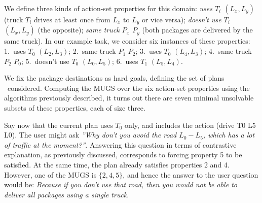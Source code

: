 We define three kinds of action-set properties for this domain:
\emph{uses $T_i$ $(L_x,L_y)$} (truck $T_i$ drives at least once from
$L_x$ to $L_y$ or vice versa); \emph{doesn't use $T_i$ $(L_x,L_y)$}
(the opposite); \emph{same truck $P_x$ $P_y$} (both packages are
delivered by the same truck). In our example task, we consider six
instances of these properties: 1.\ uses $T_0$ $(L_2,L_3)$; 2.\ same
truck $P_1$ $P_2$; 3.\ uses $T_0$ $(L_4,L_3)$; 4.\ same truck $P_2$
$P_0$; 5.\ doesn't use $T_0$ $(L_0,L_5)$; 6.\ uses $T_1$ $(L_5,L_4)$.

We fix the package destinations as hard goals, defining the set of
plans \plans\ considered. Computing the MUGS over the six action-set
properties using the algorithms previously described, it turns out
there are seven minimal unsolvable subsets of these properties, each
of size three.

Say now that the current plan uses $T_0$ only, and includes the action
(drive T0 L5 L0). The user might ask \emph{''Why don't you avoid the
  road $L_0-L_5$, which has a lot of traffic at the
  moment?''}. Answering this question in terms of contrastive
explanation, as previously discussed, corresponds to forcing property
5 to be satisfied. At the same time, the plan already satisfies
properties 2 and 4. However, one of the MUGS is $\{2,4,5\}$, and hence
the answer to the user question would be: \textit{Because if you don't
  use that road, then you would not be able to deliver all packages
  using a single truck}.

